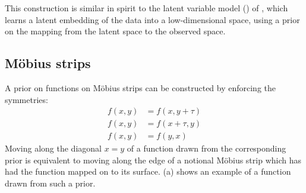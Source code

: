 This construction is similar in spirit to the \gp{} latent variable model (\gplvm{}) of \citet{lawrence2005probabilistic}, which learns a latent embedding of the data into a low-dimensional space, using a \gp{} prior on the mapping from the latent space to the observed space.



\subsection{M\"{o}bius strips}

A prior on functions on M\"{o}bius strips can be constructed by enforcing the symmetries:
%
\begin{align}
f(x, y) & = f( x, y + \tau) \\
f(x, y) & = f( x + \tau, y)  \\
f(x, y) & = f( y, x )
\end{align}
%
Moving along the diagonal $x = y$ of a function drawn from the corresponding \gp{} prior is equivalent to moving along the edge of a notional M\"{o}bius strip which has had the function mapped on to its surface.
(a) shows an example of a function drawn from such a prior.
%
